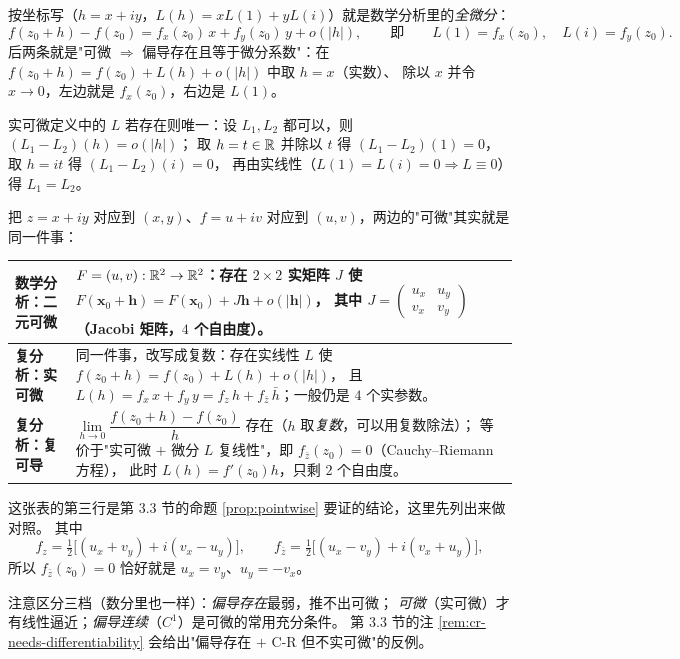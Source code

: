 \noindent
按坐标写（$h=x+iy$，$L(h)=xL(1)+yL(i)$）就是数学分析里的\emph{全微分}：
\[
f(z_0+h)-f(z_0)=f_x(z_0)\,x+f_y(z_0)\,y+o(|h|),
\qquad\text{即}\qquad L(1)=f_x(z_0),\quad L(i)=f_y(z_0).
\]
后两条就是"可微 $\Rightarrow$ 偏导存在且等于微分系数"：在 $f(z_0+h)=f(z_0)+L(h)+o(|h|)$ 中取 $h=x$（实数）、
除以 $x$ 并令 $x\to0$，左边就是 $f_x(z_0)$，右边是 $L(1)$。

实可微定义中的 $L$ 若存在则唯一：设 $L_1,L_2$ 都可以，则 $(L_1-L_2)(h)=o(|h|)$；
取 $h=t\in\mathbb{R}$ 并除以 $t$ 得 $(L_1-L_2)(1)=0$，取 $h=it$ 得 $(L_1-L_2)(i)=0$，
再由实线性（$L(1)=L(i)=0\Rightarrow L\equiv0$）得 $L_1=L_2$。

\smallskip
\noindent
把 $z=x+iy$ 对应到 $(x,y)$、$f=u+iv$ 对应到 $(u,v)$，两边的"可微"其实就是同一件事：

\begin{center}
\renewcommand{\arraystretch}{1.45}
\begin{tabular}{|p{}|p{}|}
\hline
\textbf{数学分析：二元可微} &
$F=(u,v):\mathbb{R}^2\to\mathbb{R}^2$：存在 $2\times2$ 实矩阵 $J$ 使
$F(\mathbf x_0+\mathbf h)=F(\mathbf x_0)+J\mathbf h+o(|\mathbf h|)$，
其中 $J=\begin{pmatrix}u_x&u_y\\v_x&v_y\end{pmatrix}$（Jacobi 矩阵，$4$ 个自由度）。\\
\hline
\textbf{复分析：实可微} &
同一件事，改写成复数：存在实线性 $L$ 使 $f(z_0+h)=f(z_0)+L(h)+o(|h|)$，
且 $L(h)=f_x\,x+f_y\,y=f_z\,h+f_{\bar z}\,\bar h$；一般仍是 $4$ 个实参数。\\
\hline
\textbf{复分析：复可导} &
$\lim\limits_{h\to0}\dfrac{f(z_0+h)-f(z_0)}{h}$ 存在（$h$ 取\emph{复数}，可以用复数除法）；
等价于"实可微 $+$ 微分 $L$ 复线性"，即 $f_{\bar z}(z_0)=0$（Cauchy--Riemann 方程），
此时 $L(h)=f'(z_0)h$，只剩 $2$ 个自由度。\\
\hline
\end{tabular}
\end{center}

\noindent
这张表的第三行是第 3.3 节的命题 \ref{prop:pointwise} 要证的结论，这里先列出来做对照。
其中
\[
f_z=\tfrac12\bigl[(u_x+v_y)+i(v_x-u_y)\bigr],
\qquad
f_{\bar z}=\tfrac12\bigl[(u_x-v_y)+i(v_x+u_y)\bigr],
\]
所以 $f_{\bar z}(z_0)=0$ 恰好就是 $u_x=v_y$、$u_y=-v_x$。

\smallskip
\noindent
注意区分三档（数分里也一样）：\emph{偏导存在}最弱，推不出可微；
\emph{可微}（实可微）才有线性逼近；\emph{偏导连续}（$C^1$）是可微的常用充分条件。
第 3.3 节的注 \ref{rem:cr-needs-differentiability} 会给出"偏导存在 $+$ C-R 但不实可微"的反例。

